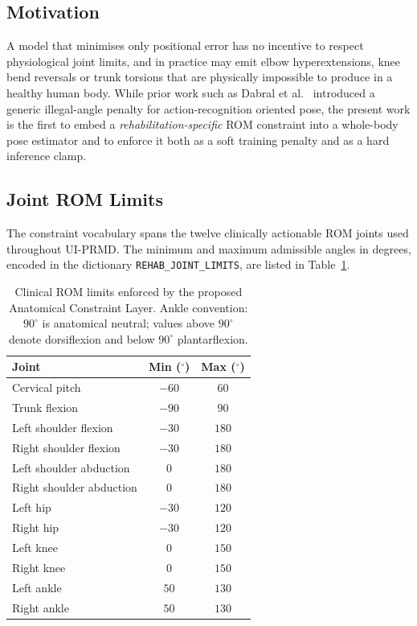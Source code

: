 \subsection{Motivation}
A model that minimises only positional error has no incentive to
respect physiological joint limits, and in practice may emit elbow
hyperextensions, knee bend reversals or trunk torsions that are
physically impossible to produce in a healthy human body. While prior
work such as Dabral et al.~\cite{Dabral2018ECCV} introduced a generic
illegal-angle penalty for action-recognition oriented pose, the
present work is the first to embed a \emph{rehabilitation-specific}
ROM constraint into a whole-body pose estimator and to enforce it both
as a soft training penalty and as a hard inference clamp.

\subsection{Joint ROM Limits}
The constraint vocabulary spans the twelve clinically actionable ROM
joints used throughout UI-PRMD. The minimum and maximum admissible
angles in degrees, encoded in the dictionary
\texttt{REHAB\_JOINT\_LIMITS}, are listed in
Table~\ref{tab:rom-limits}.

\begin{table}[h]
\centering
\caption{Clinical ROM limits enforced by the proposed Anatomical
Constraint Layer. Ankle convention: $90^{\circ}$ is anatomical neutral;
values above $90^{\circ}$ denote dorsiflexion and below $90^{\circ}$
plantarflexion.}
\label{tab:rom-limits}
\begin{tabular}{lcc}
\hline
Joint & Min ($^{\circ}$) & Max ($^{\circ}$) \\
\hline
Cervical pitch          & $-60$  & $60$  \\
Trunk flexion           & $-90$  & $90$  \\
Left  shoulder flexion  & $-30$  & $180$ \\
Right shoulder flexion  & $-30$  & $180$ \\
Left  shoulder abduction& $0$    & $180$ \\
Right shoulder abduction& $0$    & $180$ \\
Left  hip               & $-30$  & $120$ \\
Right hip               & $-30$  & $120$ \\
Left  knee              & $0$    & $150$ \\
Right knee              & $0$    & $150$ \\
Left  ankle             & $50$   & $130$ \\
Right ankle             & $50$   & $130$ \\
\hline
\end{tabular}
\end{table}


